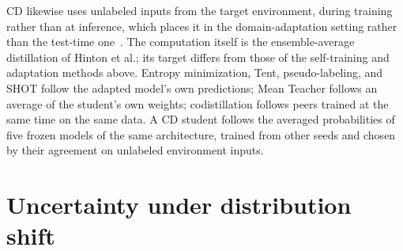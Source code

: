 CD likewise uses unlabeled inputs from the target environment, during
training rather than at inference, which places it in the
domain-adaptation setting rather than the test-time
one~\cite{wang2021tent}.
The computation itself is the ensemble-average distillation of Hinton
et al.; its target differs from those of the self-training and
adaptation methods above. Entropy minimization, Tent,
pseudo-labeling, and SHOT follow the adapted model's own predictions;
Mean Teacher follows an average of the student's own weights;
codistillation follows peers trained at the same time on the same
data. A CD student follows the averaged probabilities of five frozen
models of the same architecture, trained from other seeds and chosen
by their agreement on unlabeled environment inputs.

\section{Uncertainty under distribution shift}
\label{sec:related-uncertainty}

